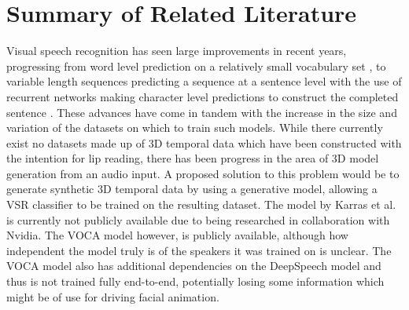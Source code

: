 \section{Summary of Related Literature}
Visual speech recognition has seen large improvements in recent years, progressing from word level prediction on a relatively small vocabulary set \cite{Chung2016}, to variable length sequences predicting a sequence at a sentence level with the use of recurrent networks making character level predictions to construct the completed sentence \cite{Shillingford2018}.
These advances have come in tandem with the increase in the size and variation of the datasets on which to train such models.
While there currently exist no datasets made up of 3D temporal data which have been constructed with the intention for lip reading, there has been progress in the area of 3D model generation from an audio input.
A proposed solution to this problem would be to generate synthetic 3D temporal data by using a generative model, allowing a VSR classifier to be trained on the resulting dataset.
The model by Karras et al. is currently not publicly available due to being researched in collaboration with Nvidia.
The VOCA model however, is publicly available, although how independent the model truly is of the speakers it was trained on is unclear.
The VOCA model also has additional dependencies on the DeepSpeech model and thus is not trained fully end-to-end, potentially losing some information which might be of use for driving facial animation.

%
%
%
